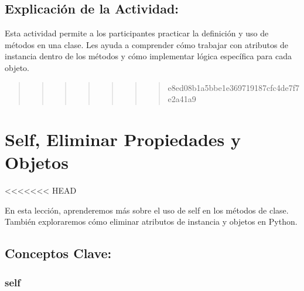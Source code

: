 \documentclass[
  a4paper,
  DIV=11,
  numbers=noendperiod,
  onepage,
  openany]{scrreprt}
\begin{document}
\hypertarget{explicaciuxf3n-de-la-actividad-51}{%
\section{Explicación de la
Actividad:}\label{explicaciuxf3n-de-la-actividad-51}}

Esta actividad permite a los participantes practicar la definición y uso
de métodos en una clase. Les ayuda a comprender cómo trabajar con
atributos de instancia dentro de los métodos y cómo implementar lógica
específica para cada objeto.

\begin{quote}
\begin{quote}
\begin{quote}
\begin{quote}
\begin{quote}
\begin{quote}
\begin{quote}
e8ed08b1a5bbe1e369719187cfc4de7f7e2a41a9
\end{quote}
\end{quote}
\end{quote}
\end{quote}
\end{quote}
\end{quote}
\end{quote}

\hypertarget{self-eliminar-propiedades-y-objetos}{%
\chapter{Self, Eliminar Propiedades y
Objetos}\label{self-eliminar-propiedades-y-objetos}}

\textless\textless\textless\textless\textless\textless\textless{} HEAD

En esta lección, aprenderemos más sobre el uso de self en los métodos de
clase. También exploraremos cómo eliminar atributos de instancia y
objetos en Python.

\hypertarget{conceptos-clave-54}{%
\section{Conceptos Clave:}\label{conceptos-clave-54}}

\hypertarget{self}{%
\subsection{self}\label{self}}
\end{document}
